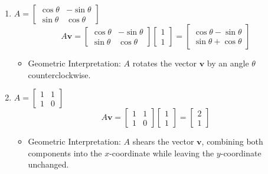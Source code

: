 \begin{intuition}
\begin{enumerate}
            \item $A = \begin{bmatrix} \cos \theta & -\sin \theta \\ \sin \theta & \cos \theta \end{bmatrix}$
            \[
            A \mathbf{v} = \begin{bmatrix} \cos \theta & -\sin \theta \\ \sin \theta & \cos \theta \end{bmatrix} \begin{bmatrix} 1 \\ 1 \end{bmatrix} = \begin{bmatrix} \cos \theta - \sin \theta \\ \sin \theta + \cos \theta \end{bmatrix}
            \]
            \begin{itemize}
                \item Geometric Interpretation: $A$ rotates the vector $\mathbf{v}$ by an angle $\theta$ counterclockwise.
            \end{itemize}
        
            \item $A = \begin{bmatrix} 1 & 1 \\ 1 & 0 \end{bmatrix}$
            \[
            A \mathbf{v} = \begin{bmatrix} 1 & 1 \\ 1 & 0 \end{bmatrix} \begin{bmatrix} 1 \\ 1 \end{bmatrix} = \begin{bmatrix} 2 \\ 1 \end{bmatrix}
            \]
            \begin{itemize}
                \item Geometric Interpretation: $A$ shears the vector $\mathbf{v}$, combining both components into the $x$-coordinate while leaving the $y$-coordinate unchanged.
            \end{itemize}
        
        \end{enumerate}        
    \end{intuition}

